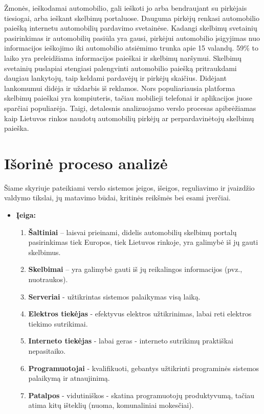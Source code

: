 \documentclass[12pt]{article}
\begin{document}
	Žmonės, ieškodamai automobilio, gali ieškoti jo arba bendraujant su pirkėjais tiesiogai, arba ieškant skelbimų portaluose. Dauguma pirkėjų renkasi automobilio paiešką internetu automobilių pardavimo svetainėse. Kadangi skelbimų svetainių pasirinkimas ir automobilių pasiūla yra gausi, pirkėjui automobilio įsigyjimas nuo informacijos ieškojimo iki automobilio atsiėmimo trunka apie 15 valandų. 59\% to laiko yra preleidžiama informacijos paieškai ir skelbimų naršymui. Skelbimų svetainių puslapiai stengiasi palengvinti automobilio paiešką pritraukdami daugiau lankytojų, taip keldami pardavėjų ir pirkėjų skaičius. Didėjant lankomumui didėja ir uždarbis iš reklamos. Nors populiariausia platforma skelbimų paieškai yra kompiuteris, tačiau mobilieji telefonai ir aplikacijos juose sparčiai populiarėja. Taigi, detalesnis analizuojamo verslo procesas apibrėžiamas kaip Lietuvos rinkos naudotų automobilių pirkėjų ar perpardavinėtojų skelbimų paieška.
	\pagebreak
	
	\section{Išorinė proceso analizė}
	Šiame skyriuje pateikiami verslo sistemos įeigos, išeigos, reguliavimo ir įvaizdžio valdymo tikslai, jų matavimo būdai, kritinės reikšmės bei esami įverčiai.
	
	\begin{itemize}
	\item{\textbf{Įeiga:}}
	\begin{enumerate}
		\item{\textbf{Šaltiniai} – laisvai prieinami, didelis automobilių skelbimų portalų pasirinkimas tiek Europos, tiek Lietuvos rinkoje, yra galimybė iš jų gauti skelbimus.}
		\item{\textbf{Skelbimai} – yra galimybė gauti iš jų reikalingos informacijos (pvz., nuotraukos).}
		\item{\textbf{Serveriai} - užtikrintas sistemos palaikymas visą laiką.}
		\item{\textbf{Elektros tiekėjas} - efektyvus elektros užtikrinimas, labai reti elektros tiekimo sutrikimai.}
		\item{\textbf{Interneto tiekėjas} - labai geras - interneto sutrikimų praktiškai nepasitaiko.}
		\item{\textbf{Programuotojai} - kvalifikuoti, gebantys užtikrinti programinės sistemos palaikymą ir atnaujinimą.}
		\item{\textbf{Patalpos} - vidutiniškos - skatina programuotojų produktyvumą, tačiau atima kitų išteklių (nuoma, komunaliniai mokesčiai).}
	\end{enumerate}
	\end{itemize}
	
\end{document}
